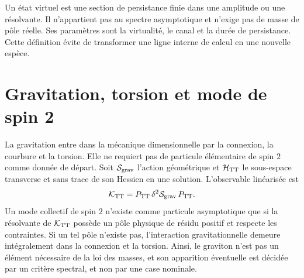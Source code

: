 Un état virtuel est une section de persistance finie dans une amplitude ou une
résolvante. Il n'appartient pas au spectre asymptotique et n'exige pas de masse de pôle
réelle. Ses paramètres sont la virtualité, le canal et la durée de
persistance. Cette définition évite de transformer une ligne interne de calcul en
une nouvelle espèce.

\section{Gravitation, torsion et mode de spin 2}

La gravitation entre dans la mécanique dimensionnelle par la connexion, la courbure et la
torsion. Elle ne requiert pas de particule élémentaire de spin \(2\) comme donnée de
départ. Soit \(\mathcal S_{\rm grav}\) l'action géométrique et
\(\mathcal H_{\rm TT}\) le sous-espace transverse et sans trace de son Hessien
en une solution. L'observable linéarisée est
\[
 \mathcal K_{\rm TT}
 =P_{\rm TT}\,\delta^2\mathcal S_{\rm grav}\,P_{\rm TT}.
\]
Un mode collectif de spin \(2\) n'existe comme particule asymptotique que
si la résolvante de \(\mathcal K_{\rm TT}\) possède un pôle physique de résidu
positif et respecte les contraintes. Si un tel pôle n'existe pas, l'interaction
gravitationnelle demeure intégralement dans la connexion et la torsion. Ainsi, le
graviton n'est pas un élément nécessaire de la loi des masses, et son apparition éventuelle
est décidée par un critère spectral, et non par une case nominale.
